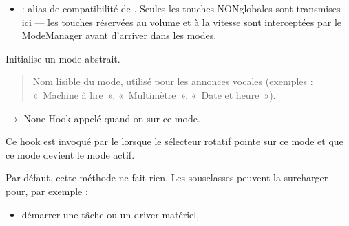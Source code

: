 \documentclass[letterpaper,10pt,french]{sphinxmanual}
\begin{document}
\begin{fulllineitems}
\begin{itemize}
\item {} 
\sphinxAtStartPar
{} : alias de compatibilité de .
Seules les touches NON\sphinxhyphen{}globales sont transmises ici — les touches
réservées au volume et à la vitesse sont interceptées par le
ModeManager avant d’arriver dans les modes.

\end{itemize}

\begin{fulllineitems}
\label{\detokenize{api/core:core.mode_base.Mode.__init__}}
\pysigstartsignatures
\pysiglinewithargsret
{}
{}
{}
\pysigstopsignatures
\sphinxAtStartPar
Initialise un mode abstrait.
\begin{quote}\begin{description}
\sphinxAtStartPar
{} \textendash{} Nom lisible du mode, utilisé pour les annonces vocales
(exemples : « Machine à lire », « Multimètre », « Date et heure »).

\end{description}\end{quote}

\end{fulllineitems}


\begin{fulllineitems}
\label{\detokenize{api/core:core.mode_base.Mode.on_enter}}
\pysigstartsignatures
\pysiglinewithargsret
{}
{}
{{ $\rightarrow$ None}}
\pysigstopsignatures
\sphinxAtStartPar
Hook appelé quand on  sur ce mode.

\sphinxAtStartPar
Ce hook est invoqué par le  lorsque le sélecteur
rotatif pointe sur ce mode et que ce mode devient le mode actif.

\sphinxAtStartPar
Par défaut, cette méthode ne fait rien. Les sous\sphinxhyphen{}classes peuvent
la surcharger pour, par exemple :
\begin{itemize}
\item {} 
\sphinxAtStartPar
démarrer une tâche ou un driver matériel,


\end{itemize}
\end{fulllineitems}
\end{fulllineitems}
\end{document}
